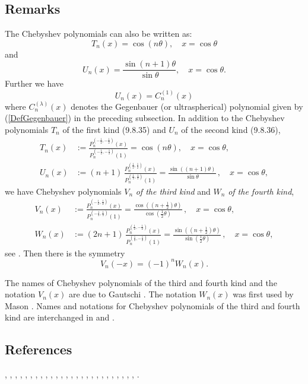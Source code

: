 \documentclass[envcountchap,graybox]{svmono}
\newcommand\tha\theta
\newcommand\half{\frac12}
\newcommand\thalf{\tfrac12}
\begin{document}
\subsection*{Remarks}
The Chebyshev polynomials can also be written as:
$$T_n(x)=\cos(n\theta),\quad x=\cos\theta$$
and
$$U_n(x)=\frac{\sin (n+1)\theta}{\sin\theta},\quad x=\cos\theta.$$
Further we have
$$U_n(x)=C_n^{(1)}(x)$$
where $C_n^{(\lambda)}(x)$ denotes the Gegenbauer (or ultraspherical)
polynomial given by (\ref{DefGegenbauer}) in the preceding subsection.
\label{sec9.8.2}
In addition to the Chebyshev polynomials $T_n$ of the first kind (9.8.35)
and $U_n$ of the second kind (9.8.36),
\begin{align}
T_n(x)&:=\frac{P_n^{(-\half,-\half)}(x)}{P_n^{(-\half,-\half)}(1)}
=\cos(n\tha),\quad x=\cos\tha,\\
U_n(x)&:=(n+1)\,\frac{P_n^{(\half,\half)}(x)}{P_n^{(\half,\half)}(1)}
=\frac{\sin((n+1)\tha)}{\sin\tha}\,,\quad x=\cos\tha,
\end{align}
we have Chebyshev polynomials $V_n$ {\em of the third kind}
and $W_n$ {\em of the fourth kind},
\begin{align}
V_n(x)&:=\frac{P_n^{(-\half,\half)}(x)}{P_n^{(-\half,\half)}(1)}
=\frac{\cos((n+\thalf)\tha)}{\cos(\thalf\tha)}\,,\quad x=\cos\tha,\\
W_n(x)&:=(2n+1)\,\frac{P_n^{(\half,-\half)}(x)}{P_n^{(\half,-\half)}(1)}
=\frac{\sin((n+\thalf)\tha)}{\sin(\thalf\tha)}\,,\quad x=\cos\tha,
\end{align}
see \cite[Section 1.2.3]{K20}. Then there is the symmetry
\begin{equation}
V_n(-x)=(-1)^n W_n(x).
\label{140}
\end{equation}

The names of Chebyshev polynomials of the third and fourth kind
and the notation $V_n(x)$ are due to Gautschi \cite{K21}.
The notation $W_n(x)$ was first used by Mason \cite{K22}.
Names and notations for Chebyshev polynomials of the third and fourth
kind are interchanged in  and
.
%

\subsection*{References}
\cite{Abram}, \cite{AskeyFitch}, \cite{AskeyGasperHarris}, \cite{AskeyIsmail76},
\cite{Bavinck95}, \cite{Chihara78}, \cite{Danese}, \cite{DilcherStolarsky},
\cite{Erdelyi+}, \cite{Grad}, \cite{HartmannStephan}, \cite{Ismail2005II}, \cite{Koekoek2000},
\cite{Luke}, \cite{Mathai}, \cite{Nikiforov+}, \cite{NikiforovUvarov}, \cite{Rainville},
\cite{Rayes+}, \cite{Rivlin}, \cite{SainteViennot}, \cite{Szego75}, \cite{Temme},
\cite{Wilson70I}, \cite{Zayed}, \cite{Zhang}, \cite{ZhangWang}.
\end{document}

